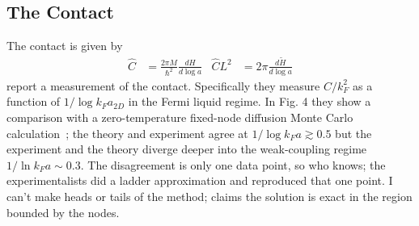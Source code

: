 \subsection{The Contact}\label{sec:contact}

The contact is given by~\cite{PhysRevA.86.013626}
\begin{align}
	\hat{C} &= \frac{2 \pi M}{\hbar^2} \frac{dH}{d\log a}
	&
	\hat{C}L^2 &= 2\pi \frac{d\tilde{H}}{d\log a} 
	\label{eq:contact}
\end{align}
 report a measurement of the contact.
Specifically they measure $C/k_F^2$ as a function of $1/\log k_F a_{2D}$ in the Fermi liquid regime.
In  Fig. 4 they show a comparison with a zero-temperature fixed-node diffusion Monte Carlo calculation~\cite{PhysRevLett.106.110403}; the theory and experiment agree at $1/\log k_F a \gtrsim 0.5$ but the experiment and the theory diverge deeper into the weak-coupling regime $1/\ln k_F a \sim 0.3$.
The disagreement is only one data point, so who knows; the experimentalists did a ladder approximation and reproduced that one point.
I can't make heads or tails of the method;  claims the solution is exact in the region bounded by the nodes.

